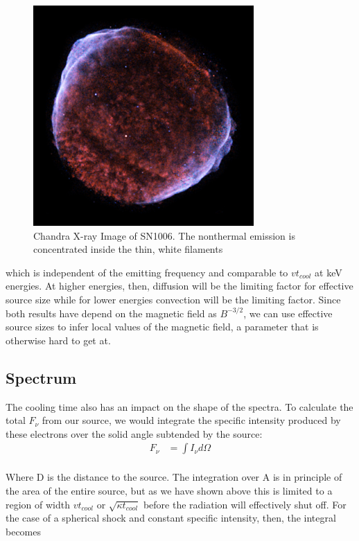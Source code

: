 \documentclass{article}
\begin{document}
\begin{figure}
    \centering
    \includegraphics[width=0.75\textwidth]{figures/SN1006Chandra.png}
    \caption{Chandra X-ray Image of SN1006. The nonthermal emission is concentrated inside the thin, white filaments}
    \label{fig:sn1006}
\end{figure}

which is independent of the emitting frequency and comparable to $vt_{cool}$ at keV energies. At higher energies, then, diffusion will be the limiting factor for effective source size while for lower energies convection will be the limiting factor.  Since both results have depend on the magnetic field as $B^{-3/2}$, we can use effective source sizes to infer local values of the magnetic field, a parameter that is otherwise hard to get at.

\subsection{Spectrum}

The cooling time also has an impact on the shape of the spectra.  To calculate the total $F_\nu$ from our source, we would integrate the specific intensity produced by these electrons over the solid angle subtended by the source:
$$\begin{aligned} F_\nu &= \int I_{\nu} d \Omega
 \\
 \end{aligned}$$

Where D is the distance to the source.  The integration over A is in principle of the area of the entire source, but as we have shown above this is limited to a region of width $vt_{cool}$ or $\sqrt{\kappa t_{cool}}$ before the radiation will effectively shut off.  For the case of a spherical shock and constant specific intensity, then, the integral becomes
 
\end{document}
